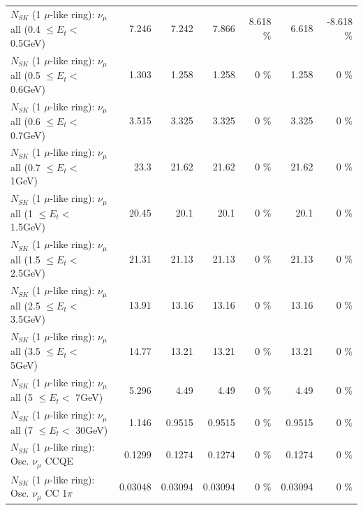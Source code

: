 \begin{table}
\begin{tabular}{| l | r | r | r  r | r  r |}
       $N_{SK}$ (1 $\mu$-like ring): $\nu_{\mu}$ all (0.4 $\leq E_{t} <$ 0.5GeV) &           7.246 &           7.242 &           7.866 &    8.618 \%  &           6.618 &   -8.618 \%  \\ 
       $N_{SK}$ (1 $\mu$-like ring): $\nu_{\mu}$ all (0.5 $\leq E_{t} <$ 0.6GeV) &           1.303 &           1.258 &           1.258 &        0 \%  &           1.258 &        0 \%  \\ 
       $N_{SK}$ (1 $\mu$-like ring): $\nu_{\mu}$ all (0.6 $\leq E_{t} <$ 0.7GeV) &           3.515 &           3.325 &           3.325 &        0 \%  &           3.325 &        0 \%  \\ 
         $N_{SK}$ (1 $\mu$-like ring): $\nu_{\mu}$ all (0.7 $\leq E_{t} <$ 1GeV) &            23.3 &           21.62 &           21.62 &        0 \%  &           21.62 &        0 \%  \\ 
         $N_{SK}$ (1 $\mu$-like ring): $\nu_{\mu}$ all (1 $\leq E_{t} <$ 1.5GeV) &           20.45 &            20.1 &            20.1 &        0 \%  &            20.1 &        0 \%  \\ 
       $N_{SK}$ (1 $\mu$-like ring): $\nu_{\mu}$ all (1.5 $\leq E_{t} <$ 2.5GeV) &           21.31 &           21.13 &           21.13 &        0 \%  &           21.13 &        0 \%  \\ 
       $N_{SK}$ (1 $\mu$-like ring): $\nu_{\mu}$ all (2.5 $\leq E_{t} <$ 3.5GeV) &           13.91 &           13.16 &           13.16 &        0 \%  &           13.16 &        0 \%  \\ 
         $N_{SK}$ (1 $\mu$-like ring): $\nu_{\mu}$ all (3.5 $\leq E_{t} <$ 5GeV) &           14.77 &           13.21 &           13.21 &        0 \%  &           13.21 &        0 \%  \\ 
           $N_{SK}$ (1 $\mu$-like ring): $\nu_{\mu}$ all (5 $\leq E_{t} <$ 7GeV) &           5.296 &            4.49 &            4.49 &        0 \%  &            4.49 &        0 \%  \\ 
          $N_{SK}$ (1 $\mu$-like ring): $\nu_{\mu}$ all (7 $\leq E_{t} <$ 30GeV) &           1.146 &          0.9515 &          0.9515 &        0 \%  &          0.9515 &        0 \%  \\ 
\hline
\hline
                               $N_{SK}$ (1 $\mu$-like ring): Osc. $\nu_\mu$ CCQE &          0.1299 &          0.1274 &          0.1274 &        0 \%  &          0.1274 &        0 \%  \\ 
                          $N_{SK}$ (1 $\mu$-like ring): Osc. $\nu_\mu$ CC 1$\pi$ &         0.03048 &         0.03094 &         0.03094 &        0 \%  &         0.03094 &        0 \%  \\ 

\end{tabular}
\end{table}
